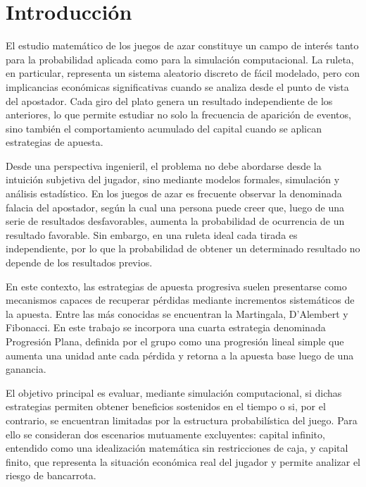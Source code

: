 \documentclass{article}
\begin{document}

\newpage

\section{Introducción}

El estudio matemático de los juegos de azar constituye un campo de interés tanto para la probabilidad aplicada como para la simulación computacional. La ruleta, en particular, representa un sistema aleatorio discreto de fácil modelado, pero con implicancias económicas significativas cuando se analiza desde el punto de vista del apostador. Cada giro del plato genera un resultado independiente de los anteriores, lo que permite estudiar no solo la frecuencia de aparición de eventos, sino también el comportamiento acumulado del capital cuando se aplican estrategias de apuesta.

Desde una perspectiva ingenieril, el problema no debe abordarse desde la intuición subjetiva del jugador, sino mediante modelos formales, simulación y análisis estadístico. En los juegos de azar es frecuente observar la denominada falacia del apostador, según la cual una persona puede creer que, luego de una serie de resultados desfavorables, aumenta la probabilidad de ocurrencia de un resultado favorable. Sin embargo, en una ruleta ideal cada tirada es independiente, por lo que la probabilidad de obtener un determinado resultado no depende de los resultados previos.

En este contexto, las estrategias de apuesta progresiva suelen presentarse como mecanismos capaces de recuperar pérdidas mediante incrementos sistemáticos de la apuesta. Entre las más conocidas se encuentran la Martingala, D'Alembert y Fibonacci. En este trabajo se incorpora una cuarta estrategia denominada Progresión Plana, definida por el grupo como una progresión lineal simple que aumenta una unidad ante cada pérdida y retorna a la apuesta base luego de una ganancia.

El objetivo principal es evaluar, mediante simulación computacional, si dichas estrategias permiten obtener beneficios sostenidos en el tiempo o si, por el contrario, se encuentran limitadas por la estructura probabilística del juego. Para ello se consideran dos escenarios mutuamente excluyentes: capital infinito, entendido como una idealización matemática sin restricciones de caja, y capital finito, que representa la situación económica real del jugador y permite analizar el riesgo de bancarrota.
\end{document}
